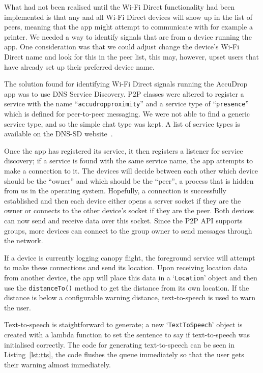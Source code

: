 What had not been realised until the Wi-Fi Direct functionality had been implemented is that any and all Wi-Fi Direct devices will show up in the list of peers, meaning that the app might attempt to communicate with for example a printer. We needed a way to identify signals that are from a device running the app. One consideration was that we could adjust change the device's Wi-Fi Direct name and look for this in the peer list, this may, however, upset users that have already set up their preferred device name.

The solution found for identifying Wi-Fi Direct signals running the AccuDrop app was to use DNS Service Discovery. P2P classes were altered to register a service with the name ``\texttt{accudropproximity}'' and a service type of ``\texttt{presence}'' which is defined for peer-to-peer messaging. We were not able to find a generic service type, and so the simple chat type was kept. A list of service types is available on the DNS-SD website~\cite{_dns_????}.

Once the app has registered its service, it then registers a listener for service discovery; if a service is found with the same service name, the app attempts to make a connection to it. The devices will decide between each other which device should be the ``owner'' and which should be the ``peer'', a process that is hidden from us in the operating system. Hopefully, a connection is successfully established and then each device either opens a server socket if they are the owner or connects to the other device's socket if they are the peer. Both devices can now send and receive data over this socket. Since the P2P API supports groups, more devices can connect to the group owner to send messages through the network.

If a device is currently logging canopy flight, the foreground service will attempt to make these connections and send its location. Upon receiving location data from another device, the app will place this data in a `\texttt{Location}' object and then use the \texttt{distanceTo()} method to get the distance from its own location. If the distance is below a configurable warning distance, text-to-speech is used to warn the user.

Text-to-speech is staightforward to generate; a new `\texttt{TextToSpeech}' object is created with a lambda function to set the sentence to say if text-to-speech was initialised correctly. The code for generating text-to-speech can be seen in Listing~\vref{lst:tts}, the code flushes the queue immediately so that the user gets their warning almost immediately.


